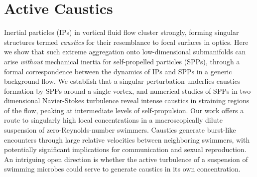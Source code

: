 \documentclass[../Rajarshi-thesis-draft.tex]{subfiles}
\begin{document}
\chapter{Active Caustics}\label{act-cstcs}



\begin{summary}
Inertial particles (IPs) in vortical fluid flow cluster strongly, forming singular structures termed \textit{caustics} for their resemblance to focal surfaces in optics. Here we show that such extreme aggregation onto low-dimensional submanifolds can arise \textit{without} mechanical inertia for self-propelled particles (SPPs), through a formal correspondence between the dynamics of IPs and SPPs in a generic background flow. We establish that a singular perturbation underlies caustics formation by SPPs around a single vortex, and numerical studies of SPPs in two-dimensional Navier-Stokes turbulence reveal intense caustics in straining regions of the flow, peaking at intermediate levels of self-propulsion. Our work offers a route to singularly high local concentrations in a macroscopically dilute suspension of zero-Reynolds-number swimmers. Caustics generate burst-like encounters through large relative velocities between neighboring swimmers, with potentially significant implications for communication and sexual reproduction. An intriguing open direction is whether the active turbulence of a suspension of swimming microbes could serve to generate caustics in its own concentration.
\end{summary}
\end{document}
